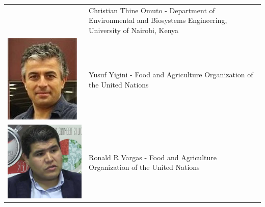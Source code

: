\documentclass[10pt,b5paper,]{book}
\theoremstyle{definition}
\theoremstyle{definition}
\theoremstyle{definition}
\theoremstyle{remark}
\begin{document}
\begin{longtable}[]{@{}ll@{}}
\begin{minipage}[t]{0.11\columnwidth}
\end{minipage} & \begin{minipage}[t]{0.83\columnwidth}\raggedright
Christian Thine Omuto - Department of Environmental and Biosystems
Engineering, University of Nairobi, Kenya\strut
\end{minipage}\tabularnewline
\begin{minipage}[t]{0.11\columnwidth}\raggedright
\includegraphics{contrAuthors/Yigini.jpg}\strut
\end{minipage} & \begin{minipage}[t]{0.83\columnwidth}\raggedright
Yusuf Yigini - Food and Agriculture Organization of the United
Nations\strut
\end{minipage}\tabularnewline
\begin{minipage}[t]{0.11\columnwidth}\raggedright
\includegraphics{contrAuthors/Vargas.jpg}\strut
\end{minipage} & \begin{minipage}[t]{0.83\columnwidth}\raggedright
Ronald R Vargas - Food and Agriculture Organization of the United
Nations\strut
\end{minipage}\tabularnewline
\bottomrule
\end{longtable}
\end{document}
